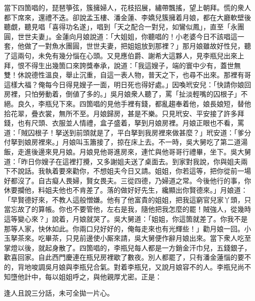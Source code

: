 當下四箇唱的，琵琶箏弦，簇擁婦人，花枝招展，繡帶飄搖，望上朝拜。慌的衆人都下席來，還禮不迭。卻說孟玉樓、潘金蓮、李嬌兒簇擁着月娘，都在大廳軟壁後聽覷，聽見唱「喜得功名遂」，唱到「天之配合一對兒，如鸞似鳳」，直至「永團圓，世世夫妻」。金蓮向月娘說道：「大姐姐，你聽唱的！小老婆今日不該唱這一套，{}他做了一對魚水團圓，世世夫妻，把姐姐放到那裡？」{}那月娘雖故好性兒，聽了這兩句，未免有幾分惱在心頭。又見應伯爵、謝希大這夥人，見李瓶兒出來上拜，恨不得生出幾箇口來誇獎奉承，說道：「我這嫂子，端的寰中少有，蓋世無雙！休說德性溫良，舉止沉重，自這一表人物，普天之下，也尋不出來。那裡有哥這樣大福？俺每今日得見嫂子一面，明日死也得好處。」{}因喚玳安兒：「快請你娘回房裡，只怕勞動着，倒値了多的。」吳月娘衆人聽了，罵「扯淡輕嘴的囚根子」不絕。良久，李瓶兒下來。四箇唱的見他手裡有錢，都亂趨奉着他，娘長娘短，替他拾花翠，疊衣裳，無所不至。月娘歸房，甚是不樂。只見玳安、平安接了許多拜錢，也有尺頭、衣服並人情禮，盒子盛着，拏到月娘房裡。月娘正眼也不看，罵道：「賊囚根子！拏送到前頭就是了，平白拏到我房裡來做甚麼？」玳安道：「爹分付拏到娘房裡來。」{}月娘叫玉簫接了，掠在床上去。不一時，吳大舅吃了第二道湯飯，走進後邊來見月娘。月娘見他哥進房來，連忙與他哥哥行禮畢，坐下。吳大舅道：「昨日你嫂子在這裡打攪，又多謝姐夫送了桌面去。到家對我說，你與姐夫兩下不說話。我執着要來勸你，不想姐夫今日又請。姐姐，你若這等，把你從前一場好都沒了。自古癡人畏婦，賢女畏夫。三從四德，乃婦道之常。今後他行的事，你休要攔他，料姐夫他也不肯差了。落的做好好先生，纔顯出你賢德來。」{}月娘道：「早賢德好來，不教人這般憎嫌。他有了他富貴的姐姐，把我這窮官兒家丫頭，只當忘故了的算帳。你也不要管他，左右是我，隨他把我怎麼的罷！賊強人，從幾時這等變心來？」說着，月娘就哭了。吳大舅道：「姐姐，你這箇就差了。你我不是那等人家，快休如此。你兩口兒好好的，俺每走來也有光輝些！」{}勸月娘一回。小玉拏茶來。吃畢茶，只見前邊使小厮來請，吳大舅便作辭月娘出來。當下衆人吃至掌燈以後，就起身散了。四箇唱的，李瓶兒每人都是一方銷金汗巾兒，五錢銀子，歡喜回家。自此西門慶連在瓶兒房裡歇了數夜。別人都罷了，只有潘金蓮惱的要不的，背地唆調吳月娘與李瓶兒合氣。對着李瓶兒，又說月娘容不的人。李瓶兒尚不知墮他計中，每以姐姐呼之，與他親厚尤密。正是：

\begin{myquote} 
逢人且說三分話，未可全拋一片心。
\end{myquote} 

